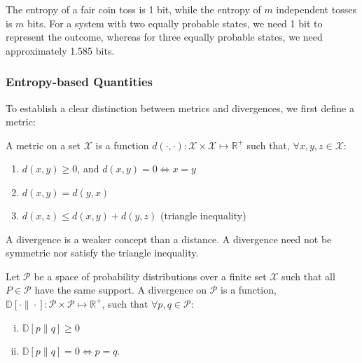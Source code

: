 \begin{example}
	The entropy of a fair coin toss is 1 bit, while the entropy of $m$ independent tosses is $m$ bits. For a system with two equally probable states, we need 1 bit to represent the outcome, whereas for three equally probable states, we need approximately 1.585 bits.
\end{example}

\subsubsection*{Entropy-based Quantities}

To establish a clear distinction between metrics and divergences, we first define a metric:

\begin{definition}
	A \textnormal{\sffamily metric} on a set $\mathcal{X}$ is a function $d(\cdot, \cdot): \mathcal{X} \times
		\mathcal{X} \mapsto \mathbb{R}^+$ such that, $\forall x, y, z \in \mathcal{X}$:
	\begin{enumerate}
		\item $d(x, y) \geq 0$, and $d(x, y) = 0 \iff x = y$
		\item $d(x, y) = d(y, x)$
		\item $d(x, z) \leq d(x, y) + d(y, z)$ (triangle inequality)
	\end{enumerate}
\end{definition}

\begin{remark}
	A divergence is a weaker concept than a distance. A divergence need not be symmetric nor satisfy the triangle inequality.
\end{remark}

\begin{definition}
	Let $\mathcal{P}$ be a space of probability distributions over a finite set $\mathcal{X}$
	such that all $P \in \mathcal{P}$ have the same support. A \textnormal{\sffamily
		divergence} on $\mathcal{P}$ is a function, $\mathbb{D}[\cdot \| \cdot]: \mathcal{P} \times \mathcal{P}
		\mapsto \mathbb{R}^+$, such that $\forall p, q \in \mathcal{P}$:
	\begin{enumerate}[(i)]
		\item $\mathbb{D}[p \| q] \geq 0$
		\item $\mathbb{D}[p \| q] = 0 \iff p = q$.
	\end{enumerate}
\end{definition}

